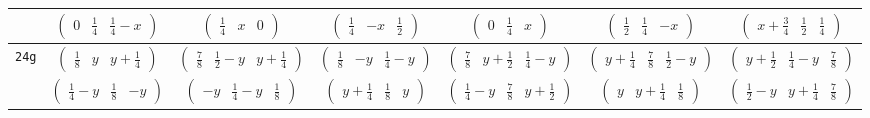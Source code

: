 \documentclass[fleqn,9pt,landscape]{jsarticle}
\begin{document}
\begin{center}
\begin{longtable}{ccccccc}
& $ \begin{pmatrix} 0 & \frac{1}{4} & \frac{1}{4} - x \end{pmatrix} $ & $ \begin{pmatrix} \frac{1}{4} & x & 0 \end{pmatrix} $ & $ \begin{pmatrix} \frac{1}{4} & - x & \frac{1}{2} \end{pmatrix} $ & $ \begin{pmatrix} 0 & \frac{1}{4} & x \end{pmatrix} $ & $ \begin{pmatrix} \frac{1}{2} & \frac{1}{4} & - x \end{pmatrix} $ & $ \begin{pmatrix} x + \frac{3}{4} & \frac{1}{2} & \frac{1}{4} \end{pmatrix} $ \\ \hline
{\tt 24g} & $ \begin{pmatrix} \frac{1}{8} & y & y + \frac{1}{4} \end{pmatrix} $ & $ \begin{pmatrix} \frac{7}{8} & \frac{1}{2} - y & y + \frac{1}{4} \end{pmatrix} $ & $ \begin{pmatrix} \frac{1}{8} & - y & \frac{1}{4} - y \end{pmatrix} $ & $ \begin{pmatrix} \frac{7}{8} & y + \frac{1}{2} & \frac{1}{4} - y \end{pmatrix} $ & $ \begin{pmatrix} y + \frac{1}{4} & \frac{7}{8} & \frac{1}{2} - y \end{pmatrix} $ & $ \begin{pmatrix} y + \frac{1}{2} & \frac{1}{4} - y & \frac{7}{8} \end{pmatrix} $ \\
& $ \begin{pmatrix} \frac{1}{4} - y & \frac{1}{8} & - y \end{pmatrix} $ & $ \begin{pmatrix} - y & \frac{1}{4} - y & \frac{1}{8} \end{pmatrix} $ & $ \begin{pmatrix} y + \frac{1}{4} & \frac{1}{8} & y \end{pmatrix} $ & $ \begin{pmatrix} \frac{1}{4} - y & \frac{7}{8} & y + \frac{1}{2} \end{pmatrix} $ & $ \begin{pmatrix} y & y + \frac{1}{4} & \frac{1}{8} \end{pmatrix} $ & $ \begin{pmatrix} \frac{1}{2} - y & y + \frac{1}{4} & \frac{7}{8} \end{pmatrix} $ \\ \hline

\end{longtable}
\end{center}
\end{document}
